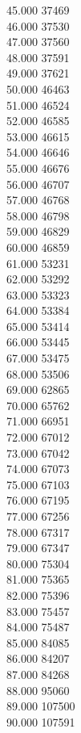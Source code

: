 { 45.000	37469 \\
 46.000	37530 \\
 47.000	37560 \\
 48.000	37591 \\
 49.000	37621 \\
 50.000	46463 \\
 51.000	46524 \\
 52.000	46585 \\
 53.000	46615 \\
 54.000	46646 \\
 55.000	46676 \\
 56.000	46707 \\
 57.000	46768 \\
 58.000	46798 \\
 59.000	46829 \\
 60.000	46859 \\
 61.000	53231 \\
 62.000	53292 \\
 63.000	53323 \\
 64.000	53384 \\
 65.000	53414 \\
 66.000	53445 \\
 67.000	53475 \\
 68.000	53506 \\
 69.000	62865 \\
 70.000	65762 \\
 71.000	66951 \\
 72.000	67012 \\
 73.000	67042 \\
 74.000	67073 \\
 75.000	67103 \\
 76.000	67195 \\
 77.000	67256 \\
 78.000	67317 \\
 79.000	67347 \\
 80.000	75304 \\
 81.000	75365 \\
 82.000	75396 \\
 83.000	75457 \\
 84.000	75487 \\
 85.000	84085 \\
 86.000	84207 \\
 87.000	84268 \\
 88.000	95060 \\
 89.000	107500 \\
 90.000	107591 \\
}

